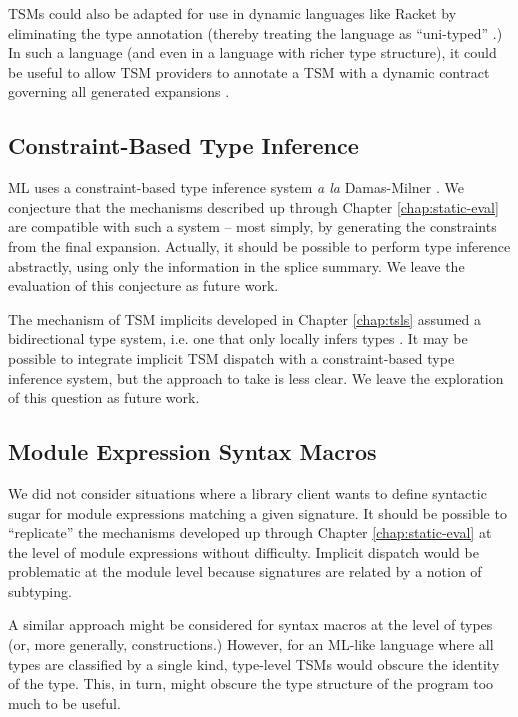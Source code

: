 TSMs could also be adapted for use in dynamic languages like Racket  by eliminating the type annotation (thereby treating the language as ``uni-typed'' \cite{scott1980lambda,pfpl}.) In such a language (and  even in a language with richer type structure), it could be useful to allow TSM providers to annotate a TSM with a dynamic contract governing all generated expansions \cite{DBLP:conf/icfp/FindlerF02}. 

\vspace{-4px}
\subsection{Constraint-Based Type Inference}\label{sec:type-inference}
ML uses a constraint-based type inference system \emph{a la} Damas-Milner \cite{damas1982principal}. We conjecture that the mechanisms described up through Chapter \ref{chap:static-eval} are compatible with such a system -- most simply, by generating the constraints from the final expansion. Actually, it should be possible to perform type inference abstractly, using only the information in the splice summary. We leave the evaluation of this conjecture as future work.

The mechanism of TSM implicits developed in Chapter \ref{chap:tsls} assumed a bidirectional type system, i.e. one that only locally infers types \cite{Pierce:2000:LTI:345099.345100}. It may be possible to integrate implicit TSM dispatch with a constraint-based type inference system, but the approach to take is less clear. We leave the exploration of this question as future work.

\vspace{-4px}
\subsection{Module Expression Syntax Macros}
We did not consider situations where a library client wants to define syntactic sugar for  module expressions matching a given signature. It should be possible to ``replicate'' the mechanisms developed up through Chapter \ref{chap:static-eval} at the level of module expressions without difficulty. Implicit dispatch would be problematic at the module level because signatures are related by a notion of subtyping.

A similar approach might be considered for syntax macros at the level of types (or, more generally, constructions.) However, for an ML-like language where all types are classified by a single kind, type-level TSMs would obscure the identity of the type. This, in turn, might obscure the type structure of the program too much to be useful.

